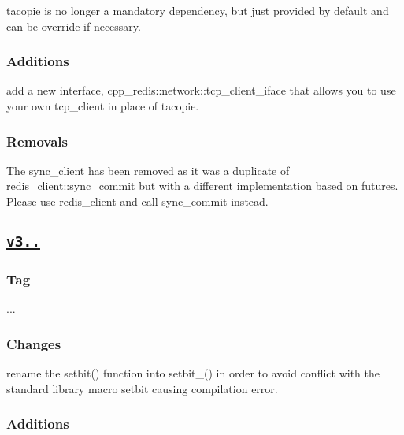 \begin{DoxyItemize}
\item tacopie is no longer a mandatory dependency, but just provided by default and can be override if necessary. \subsubsection*{Additions}
\end{DoxyItemize}


\begin{DoxyItemize}
\item add a new interface, {\ttfamily cpp\+\_\+redis\+::network\+::tcp\+\_\+client\+\_\+iface} that allows you to use your own tcp\+\_\+client in place of tacopie. \subsubsection*{Removals}
\end{DoxyItemize}


\begin{DoxyItemize}
\item The {\ttfamily sync\+\_\+client} has been removed as it was a duplicate of {\ttfamily redis\+\_\+client\+::sync\+\_\+commit} but with a different implementation based on futures. Please use {\ttfamily redis\+\_\+client} and call {\ttfamily sync\+\_\+commit} instead.
\end{DoxyItemize}

\subsection*{\href{https://github.com/Cylix/cpp_redis/releases/tag/3.1.2}{\tt v3..}}

\subsubsection*{Tag}

{..}. \subsubsection*{Changes}


\begin{DoxyItemize}
\item rename the {\ttfamily setbit()} function into {\ttfamily setbit\+\_\+()} in order to avoid conflict with the standard library macro {\ttfamily setbit} causing compilation error. \subsubsection*{Additions}
\end{DoxyItemize}


